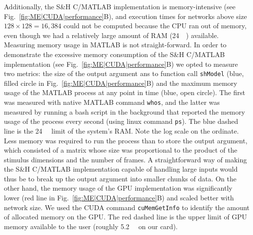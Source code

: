 Additionally, the S\&H C/MATLAB implementation is
memory-intensive (see Fig.~\ref{fig:ME|CUDA|performance}B), 
and execution times for networks
above size $128\times128=16,384$ could not be computed
because the \ac{CPU} ran out of memory, even though we had a
relatively large amount of \ac{RAM} (\SI{24}{\giga\byte}) available. 
Measuring memory usage in MATLAB is not straight-forward.
In order to demonstrate the excessive memory consumption of the S\&H
C/MATLAB implementation (see Fig.~\ref{fig:ME|CUDA|performance}B)
we opted to measure two metrics: 
the size of the output argument ans to function
call \texttt{shModel} (blue, filled circle in 
Fig.~\ref{fig:ME|CUDA|performance}B) and the maximum
memory usage of the MATLAB process at any point in time
(blue, open circle). The first was measured with native
MATLAB command \texttt{whos}, and the latter was measured by
running a bash script in the background that reported the
memory usage of the process every second (using linux command
\texttt{ps}). The blue dashed line is the \SI{24}{\giga\byte}
limit of the system's \ac{RAM}. 
Note the log scale on the ordinate. Less
memory was required to run the process than to store the
output argument, which consisted of a matrix whose size
was proportional to the product of the stimulus dimensions
and the number of frames. A straightforward way of making
the S\&H C/MATLAB implementation capable of handling large
inputs would thus be to break up the output argument into
smaller chunks of data. On the other hand, the memory usage
of the \ac{GPU} implementation was significantly lower (red line
in Fig.~\ref{fig:ME|CUDA|performance}B)
and scaled better with network size. We used the
\ac{CUDA} command \texttt{cuMemGetInfo} to identify the amount
of allocated memory on the \ac{GPU}. The red dashed line is the
upper limit of \ac{GPU} memory available to the user (roughly
\SI{5.2}{\giga\byte} on our card).


